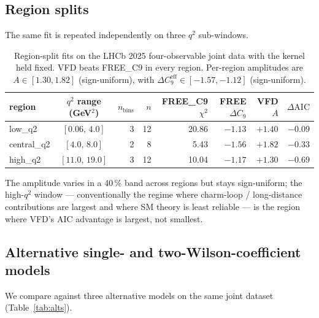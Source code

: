 \subsection{Region splits}

The same fit is repeated independently on three $q^{2}$ sub-windows.

\begin{table}[h]
\centering
\small
\begin{tabular}{lcrrrrrr}
\toprule
region & $q^{2}$ range (GeV$^{2}$) & $n_{\mathrm{bins}}$ & $n$ &
   FREE\_C9 $\chi^{2}$ & FREE $\Delta C_{9}$ &
   VFD $A$ & $\Delta\mathrm{AIC}$ \\
\midrule
low\_q2     & $[0.06,\,4.0]$  & 3 & 12 & 20.86 & $-1.13$ & $+1.40$ & $-0.09$ \\
central\_q2 & $[4.0,\,8.0]$   & 2 &  8 &  5.43 & $-1.56$ & $+1.82$ & $-0.33$ \\
high\_q2    & $[11.0,\,19.0]$ & 3 & 12 & 10.04 & $-1.17$ & $+1.30$ & $-0.69$ \\
\bottomrule
\end{tabular}
\caption{Region-split fits on the LHCb 2025 four-observable joint
data with the kernel held fixed. VFD beats FREE\_C9 in every region.
Per-region amplitudes are $A\in[1.30, 1.82]$ (sign-uniform), with
$\Delta C_{9}^{\mathrm{eff}}\in[-1.57, -1.12]$ (sign-uniform).}
\label{tab:regions}
\end{table}

The amplitude varies in a 40\,\% band across regions but stays
sign-uniform; the high-$q^{2}$ window — conventionally the regime
where charm-loop / long-distance contributions are largest and where
SM theory is least reliable — is the region where VFD's AIC advantage
is largest, not smallest.

\subsection{Alternative single- and two-Wilson-coefficient models}

We compare against three alternative models on the same joint dataset
(Table~\ref{tab:alts}).

